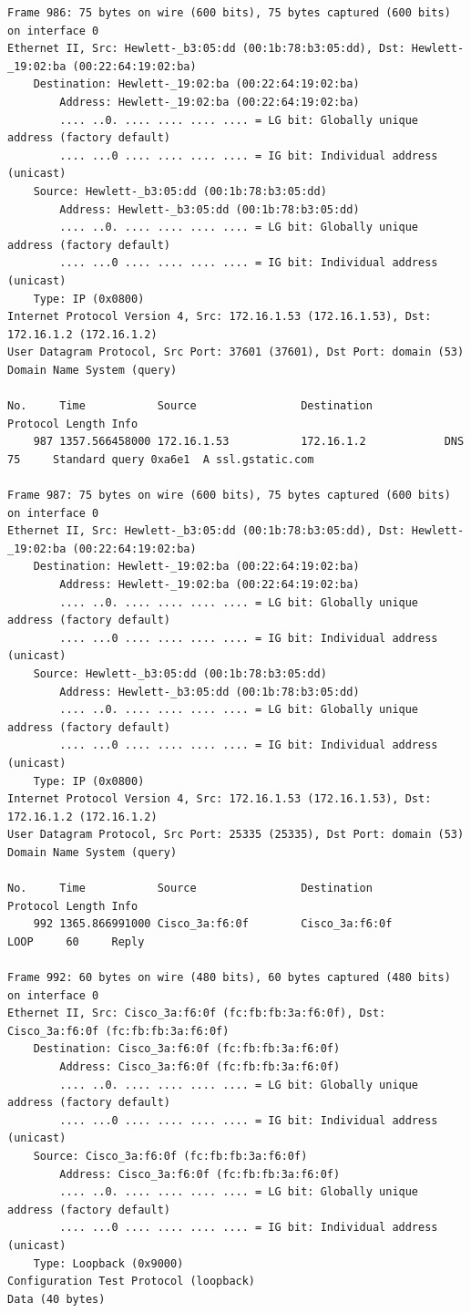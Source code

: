 \documentclass[a4paper,11pt]{article}
\begin{document}
\begin{lstlisting}
Frame 986: 75 bytes on wire (600 bits), 75 bytes captured (600 bits) on interface 0
Ethernet II, Src: Hewlett-_b3:05:dd (00:1b:78:b3:05:dd), Dst: Hewlett-_19:02:ba (00:22:64:19:02:ba)
    Destination: Hewlett-_19:02:ba (00:22:64:19:02:ba)
        Address: Hewlett-_19:02:ba (00:22:64:19:02:ba)
        .... ..0. .... .... .... .... = LG bit: Globally unique address (factory default)
        .... ...0 .... .... .... .... = IG bit: Individual address (unicast)
    Source: Hewlett-_b3:05:dd (00:1b:78:b3:05:dd)
        Address: Hewlett-_b3:05:dd (00:1b:78:b3:05:dd)
        .... ..0. .... .... .... .... = LG bit: Globally unique address (factory default)
        .... ...0 .... .... .... .... = IG bit: Individual address (unicast)
    Type: IP (0x0800)
Internet Protocol Version 4, Src: 172.16.1.53 (172.16.1.53), Dst: 172.16.1.2 (172.16.1.2)
User Datagram Protocol, Src Port: 37601 (37601), Dst Port: domain (53)
Domain Name System (query)

No.     Time           Source                Destination           Protocol Length Info
    987 1357.566458000 172.16.1.53           172.16.1.2            DNS      75     Standard query 0xa6e1  A ssl.gstatic.com

Frame 987: 75 bytes on wire (600 bits), 75 bytes captured (600 bits) on interface 0
Ethernet II, Src: Hewlett-_b3:05:dd (00:1b:78:b3:05:dd), Dst: Hewlett-_19:02:ba (00:22:64:19:02:ba)
    Destination: Hewlett-_19:02:ba (00:22:64:19:02:ba)
        Address: Hewlett-_19:02:ba (00:22:64:19:02:ba)
        .... ..0. .... .... .... .... = LG bit: Globally unique address (factory default)
        .... ...0 .... .... .... .... = IG bit: Individual address (unicast)
    Source: Hewlett-_b3:05:dd (00:1b:78:b3:05:dd)
        Address: Hewlett-_b3:05:dd (00:1b:78:b3:05:dd)
        .... ..0. .... .... .... .... = LG bit: Globally unique address (factory default)
        .... ...0 .... .... .... .... = IG bit: Individual address (unicast)
    Type: IP (0x0800)
Internet Protocol Version 4, Src: 172.16.1.53 (172.16.1.53), Dst: 172.16.1.2 (172.16.1.2)
User Datagram Protocol, Src Port: 25335 (25335), Dst Port: domain (53)
Domain Name System (query)

No.     Time           Source                Destination           Protocol Length Info
    992 1365.866991000 Cisco_3a:f6:0f        Cisco_3a:f6:0f        LOOP     60     Reply

Frame 992: 60 bytes on wire (480 bits), 60 bytes captured (480 bits) on interface 0
Ethernet II, Src: Cisco_3a:f6:0f (fc:fb:fb:3a:f6:0f), Dst: Cisco_3a:f6:0f (fc:fb:fb:3a:f6:0f)
    Destination: Cisco_3a:f6:0f (fc:fb:fb:3a:f6:0f)
        Address: Cisco_3a:f6:0f (fc:fb:fb:3a:f6:0f)
        .... ..0. .... .... .... .... = LG bit: Globally unique address (factory default)
        .... ...0 .... .... .... .... = IG bit: Individual address (unicast)
    Source: Cisco_3a:f6:0f (fc:fb:fb:3a:f6:0f)
        Address: Cisco_3a:f6:0f (fc:fb:fb:3a:f6:0f)
        .... ..0. .... .... .... .... = LG bit: Globally unique address (factory default)
        .... ...0 .... .... .... .... = IG bit: Individual address (unicast)
    Type: Loopback (0x9000)
Configuration Test Protocol (loopback)
Data (40 bytes)


\end{lstlisting}
\end{document}

